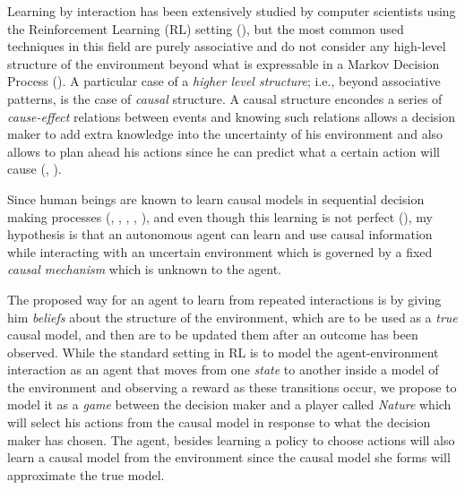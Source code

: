 \documentclass[english,letterpaper,12pt,final]{article}
\theoremstyle{definition}
\begin{document}

Learning by interaction has been extensively studied by computer scientists using the Reinforcement Learning (RL) setting (\cite{sutton1998reinforcement}), but the most common used techniques  in this field are purely associative and do not consider any high-level structure of the environment beyond what is expressable in a Markov Decision Process (\cite{garnelo2016towards}). A particular case of a \textit{higher level structure}; i.e., beyond associative patterns, is the case of \textit{causal} structure. A causal structure encondes a series of \textit{cause-effect} relations between events and knowing such relations allows a decision maker to add extra knowledge into the uncertainty of his environment and also allows to plan ahead his actions since he can predict what a certain action will cause (\cite{spirtes2000causation}, \cite{pearl2018theoretical}).

Since human beings are known to learn causal models in sequential decision making processes (\cite{sloman2006causal}, \cite{nichols2007decision}, \cite{meder2010observing}, \cite{hagmayer2013repeated}, \cite{danks2014unifying}), and even though this learning is not perfect (\cite{rottman2014reasoning}), my hypothesis is that an autonomous agent can learn and use causal information while interacting with an uncertain environment which is governed by a fixed \textit{causal mechanism} which is unknown to the agent.  

The proposed way for an agent to learn from repeated interactions is by giving him \textit{beliefs} about the structure of the environment, which are to be used as a \textit{true} causal model, and then are to be updated them after an outcome has been observed. While the standard setting in RL is to model the agent-environment interaction as an agent that moves from one \textit{state} to another inside a model of the environment and observing a reward as these transitions occur, we propose to model it as a \textit{game} between the decision maker and a player called \textit{Nature} which will select his actions from the causal model in response to what the decision maker has chosen. The agent, besides learning a policy to choose actions will also learn a causal model from the environment since the causal model she forms will approximate the true model.
\end{document}
